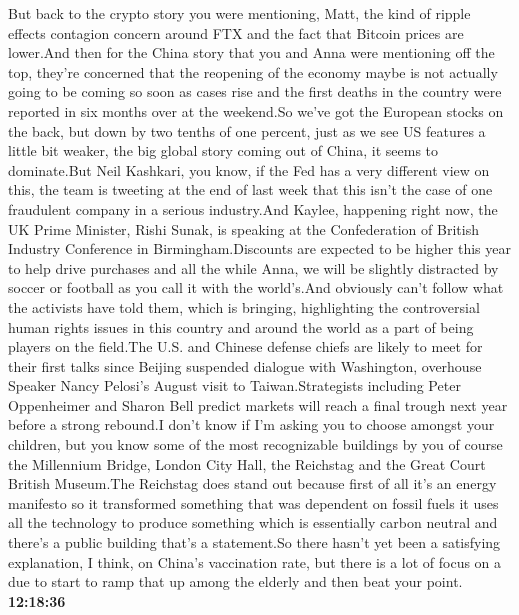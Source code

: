 \documentclass{article}%
\begin{document}
But back to the crypto story you were mentioning, Matt, the kind of ripple effects contagion concern around FTX and the fact that Bitcoin prices are lower.And then for the China story that you and Anna were mentioning off the top, they're concerned that the reopening of the economy maybe is not actually going to be coming so soon as cases rise and the first deaths in the country were reported in six months over at the weekend.So we've got the European stocks on the back, but down by two tenths of one percent, just as we see US features a little bit weaker, the big global story coming out of China, it seems to dominate.But Neil Kashkari, you know, if the Fed has a very different view on this, the team is tweeting at the end of last week that this isn't the case of one fraudulent company in a serious industry.And Kaylee, happening right now, the UK Prime Minister, Rishi Sunak, is speaking at the Confederation of British Industry Conference in Birmingham.Discounts are expected to be higher this year to help drive purchases and all the while Anna, we will be slightly distracted by soccer or football as you call it with the world's.And obviously can't follow what the activists have told them, which is bringing, highlighting the controversial human rights issues in this country and around the world as a part of being players on the field.The U.S. and Chinese defense chiefs are likely to meet for their first talks since Beijing suspended dialogue with Washington, overhouse Speaker Nancy Pelosi's August visit to Taiwan.Strategists including Peter Oppenheimer and Sharon Bell predict markets will reach a final trough next year before a strong rebound.I don't know if I'm asking you to choose amongst your children, but you know some of the most recognizable buildings by you of course the Millennium Bridge, London City Hall, the Reichstag and the Great Court British Museum.The Reichstag does stand out because first of all it's an energy manifesto so it transformed something that was dependent on fossil fuels it uses all the technology to produce something which is essentially carbon neutral and there's a public building that's a statement.So there hasn't yet been a satisfying explanation, I think, on China's vaccination rate, but there is a lot of focus on a due to start to ramp that up among the elderly and then beat your point.%
\textbf{12:18:36}%
\newline%
\end{document}
